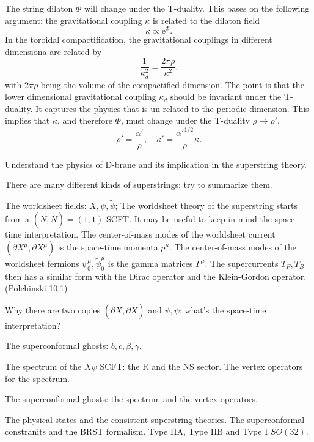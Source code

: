 The string dilaton $\Phi$ will change under the T-duality.
This bases on the following argument:
the gravitational coupling $\kappa$ is related to the dilaton field
\[
	\kappa \propto \mathrm{e}^{\Phi}
.\] 
In the toroidal compactification,
the gravitational couplings in different dimensiona are related by
\[
\frac{1}{\kappa_d^2} = \frac{2 \pi \rho}{\kappa^2}
.\] 
with $2\pi\rho$ being the volume of the compactified dimension.
The point is that
the lower dimensional gravitational coupling $\kappa_d$
should be invariant under the T-duality.
It captures the physics that is un-related to the periodic dimension.
This implies that $\kappa$, and therefore $\Phi$, must change under the T-duality $\rho\to\rho'$.
\begin{equation}
	\rho' = \frac{\alpha'}{\rho},\quad
	\kappa' = \frac{\alpha'^{1 / 2}}{\rho}\kappa.
\end{equation}

\begin{todo}
Understand the physics of D-brane
and its implication in the superstring theory.  
\end{todo}

\begin{todo}
There are many different kinds of superstrings: try to summarize them.	
\end{todo}

The worldsheet fields: $X,\psi,\tilde{\psi}$;
The worldsheet theory of the superstring
starts from a $(N,\tilde{N})=(1,1)$ SCFT.
It may be useful to keep in mind the space-time interpretation.
The center-of-mass modes of the worldsheet current $(\partial X^\mu,\overline{\partial}X^\mu)$ is the space-time momenta $p^\mu$.
The center-of-mass modes of the worldsheet fermions $\psi_0^\mu,\tilde{\psi}_0^\mu$ is the gamma matrices $\Gamma^\mu$.
The supercurrents $T_F,T_B$ then has a similar form with
the Dirac operator and the Klein-Gordon operator.
(Polchinski 10.1)

\begin{question}
Why there are two copies $(\partial X,\overline{\partial}X)$
and $\psi,\tilde{\psi}$: what's the space-time interpretation?
\end{question}

The superconformal ghosts: $b,c,\beta,\gamma$.

The spectrum of the $X\psi$ SCFT: the R and the NS sector.
The vertex operators for the spectrum.

The superconformal ghosts: the spectrum and the vertex operators.

The physical states and the consistent superstring theories.
The superconformal constranits and the BRST formalism.
Type IIA, Type IIB and Type I $SO(32)$.
